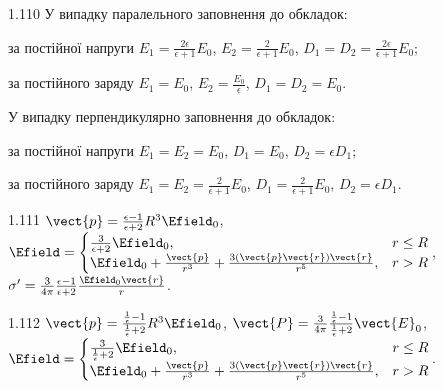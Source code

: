 \begin{Solution}{1.{110}}
		У випадку паралельного заповнення до обкладок:
		\begin{enumerate*}[label=\alph*)]
			\item за постійної напруги
			$E_1 = \frac{2\epsilon}{\epsilon + 1} E_0$, $E_2 = \frac{2}{\epsilon + 1} E_0$, $D_1 = D_2 = \frac{2\epsilon}{\epsilon + 1} E_0$;
			\item за постійного заряду
			$E_1 = E_0$, $E_2 = \frac{E_0}{\epsilon}$, $D_1 = D_2 = E_0$.
		\end{enumerate*}
		У випадку перпендикулярно заповнення до обкладок:
		\begin{enumerate*}[label=\alph*)]
			\item за постійної напруги
			$E_1 = E_2 = E_0$, $D_1 = E_0$, $D_2 = \epsilon D_1$;
			\item за постійного заряду
			$E_1 = E_2 = \frac{2}{\epsilon + 1} E_0$, $D_1 = \frac{2}{\epsilon + 1} E_0$, $D_2 = \epsilon D_1$.
		\end{enumerate*}
	
\end{Solution}
\begin{Solution}{1.{111}}
	$\vect{p} = \frac{\epsilon - 1}{\epsilon + 2}R^3\Efield_0$,
	$
		\Efield =
		\begin{cases}
			\frac{3}{\epsilon + 2} \Efield_0,                                                       & r \le R \\
			\Efield_0 + \frac{\vect{p}}{r^3} + \frac{3\left(\vect{p}\vect{r}\right)\vect{r} }{r^5}, & r > R
		\end{cases}
	$,
	$\sigma' = \frac{3}{4\pi} \frac{\epsilon - 1}{\epsilon + 2} \frac{\Efield_0\vect{r}}{r}$.
\end{Solution}
\begin{Solution}{1.{112}}
	$\vect{p} = \frac{\frac{1}{\epsilon} - 1}{\frac{1}{\epsilon} + 2}R^3\Efield_0$,
	$\vect{P} = \frac{3}{4\pi} \frac{\frac{1}{\epsilon} - 1}{\frac{1}{\epsilon} + 2} \vect{E}_0$,
	$
		\Efield =
		\begin{cases}
			\frac{3}{\frac{1}{\epsilon} + 2} \Efield_0,                                             & r \le R \\
			\Efield_0 + \frac{\vect{p}}{r^3} + \frac{3\left(\vect{p}\vect{r}\right)\vect{r} }{r^5}, & r > R
		\end{cases}
	$.
\end{Solution}
